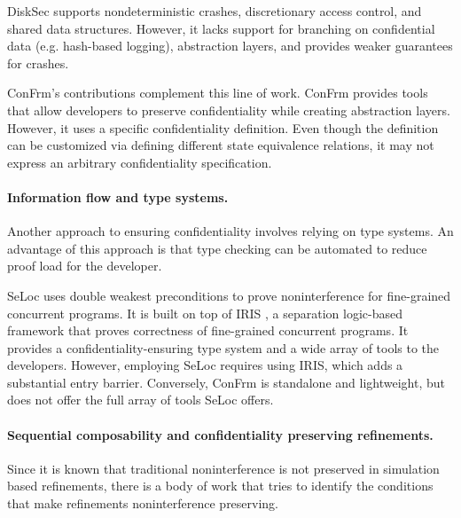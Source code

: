 DiskSec supports nondeterministic crashes, discretionary access control, and shared data structures. However, it lacks support for branching on confidential data (e.g. hash-based logging), abstraction layers, and provides weaker guarantees for crashes. 

ConFrm's contributions complement this line of work. ConFrm provides tools that allow developers to preserve confidentiality while creating abstraction layers. However, it uses a specific confidentiality definition. Even though the definition can be customized via defining different state equivalence relations, it may not express an arbitrary confidentiality specification.

\paragraph{Information flow and type systems.} 
Another approach to ensuring confidentiality involves relying on type systems. An advantage of this approach is that type checking can be automated to reduce proof load for the developer. 


SeLoc \cite{seloc} uses double weakest preconditions to prove noninterference for fine-grained concurrent programs. It is built on top of IRIS \cite{iris}, a separation logic-based framework that proves correctness of fine-grained concurrent programs. It provides a confidentiality-ensuring type system and a wide array of tools to the developers. However, employing SeLoc requires using IRIS, which adds a substantial entry barrier. Conversely, ConFrm is standalone and lightweight, but does not offer the full array of tools SeLoc offers. 

\paragraph{Sequential composability and confidentiality preserving refinements.} 
Since it is known that traditional noninterference is not preserved in simulation based refinements, there is a body of work that tries to identify the conditions that make refinements noninterference preserving. 

